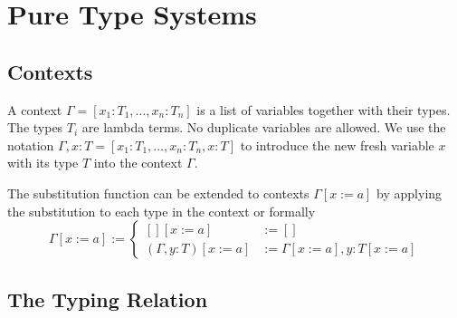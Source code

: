 \section{Pure Type Systems}

\subsection{Contexts}

\begin{definition}
  A context $\Gamma = [x_1:T_1, \ldots, x_n:T_n]$ is a list of variables
  together with their types. The types $T_i$ are lambda terms. No duplicate
  variables are allowed. We use the notation
  $\Gamma,x:T = [x_1:T_1, \ldots, x_n:T_n, x:T]$ to introduce the new fresh
  variable $x$ with its type $T$ into the context $\Gamma$.
\end{definition}

The substitution function can be extended to contexts $\Gamma[x:=a]$ by
applying the substitution to each type in the context or formally
$$
\Gamma[x:=a] :=
\begin{cases}
  [][x:=a] &:= []
  \\
  (\Gamma,y:T)[x:=a] &:= \Gamma[x:=a],y:T[x:=a]
\end{cases}
$$



\subsection{The Typing Relation}

